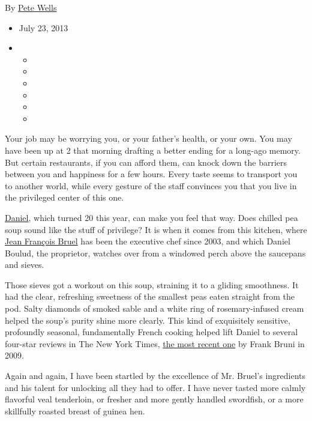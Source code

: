 By \href{https://www.nytimes3xbfgragh.onion/by/pete-wells}{Pete Wells}

\begin{itemize}
\item
  July 23, 2013
\item
  \begin{itemize}
  \item
  \item
  \item
  \item
  \item
  \item
  \end{itemize}
\end{itemize}

Your job may be worrying you, or your father's health, or your own. You
may have been up at 2 that morning drafting a better ending for a
long-ago memory. But certain restaurants, if you can afford them, can
knock down the barriers between you and happiness for a few hours. Every
taste seems to transport you to another world, while every gesture of
the staff convinces you that you live in the privileged center of this
one.

\href{http://danielnyc.com/}{Daniel}, which turned 20 this year, can
make you feel that way. Does chilled pea soup sound like the stuff of
privilege? It is when it comes from this kitchen, where
\href{http://danielnyc.com/jean-francois-bruel-executive-chef}{Jean
François Bruel} has been the executive chef since 2003, and which Daniel
Boulud, the proprietor, watches over from a windowed perch above the
saucepans and sieves.

Those sieves got a workout on this soup, straining it to a gliding
smoothness. It had the clear, refreshing sweetness of the smallest peas
eaten straight from the pod. Salty diamonds of smoked sable and a white
ring of rosemary-infused cream helped the soup's purity shine more
clearly. This kind of exquisitely sensitive, profoundly seasonal,
fundamentally French cooking helped lift Daniel to several four-star
reviews in The New York Times,
\href{http://www.nytimes3xbfgragh.onion/2009/01/21/dining/reviews/21rest.html?pagewanted=all}{the
most recent one} by Frank Bruni in 2009.

Again and again, I have been startled by the excellence of Mr. Bruel's
ingredients and his talent for unlocking all they had to offer. I have
never tasted more calmly flavorful veal tenderloin, or fresher and more
gently handled swordfish, or a more skillfully roasted breast of guinea
hen.

